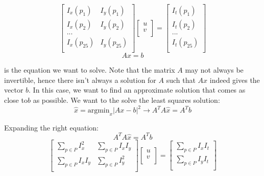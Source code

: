 \documentclass[12pt]{article}
\begin{document}
\begin{equation*}
\begin{bmatrix}
I_x(p_1) & I_y(p_1) \\
I_x(p_2) & I_y(p_2) \\
...\\
I_x(p_{25}) & I_y(p_{25}) \\
\end{bmatrix}
\begin{bmatrix}
u \\
v \\
\end{bmatrix} = 
\begin{bmatrix}
I_t(p_1)\\
I_t(p_2) \\
...\\
I_t(p_{25}) \\
\end{bmatrix} 
\end{equation*}
\begin{equation*}
Ax = b
\end{equation*}

is the equation we want to solve. Note that the matrix $A$ may not always be invertible, hence there isn't always a solution for $A$ such that $Ax$ indeed gives the vector $b$. In this case, we want to find an approximate solution that comes as close to$b$ as possible. We want to the solve the least squares solution:
\begin{equation*}
\hat{x} = \text{argmin}_x | Ax - b|^2 \rightarrow A^TA\hat{x} = A^Tb
\end{equation*}

Expanding the right equation:
\begin{equation*}
A^TA\hat{x} = A^Tb
\end{equation*}
\begin{equation*}
\begin{bmatrix}
\sum_{p \in P} I_x^2 & \sum_{p \in P} I_xI_y \\
\sum_{p \in P} I_xI_y & \sum_{p \in P} I_y^2 \\
\end{bmatrix}
\begin{bmatrix}
u \\
v \\
\end{bmatrix} = 
\begin{bmatrix}
\sum_{p \in P} I_xI_t \\
\sum_{p \in P} I_yI_t \\
\end{bmatrix} 
\end{equation*}
\end{document}
